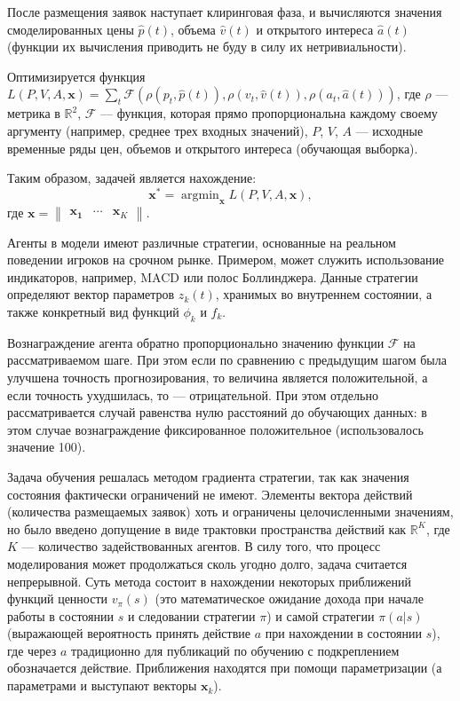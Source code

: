 \documentclass[12pt, a4paper]{extarticle}
\DeclareMathOperator*{\argmin}{argmin}
\renewcommand{\vec}[1]{\mathbf{#1}}
\begin{document}
После размещения заявок наступает клиринговая фаза, и вычисляются значения смоделированных цены $\hat{p}(t)$, 
объема $\hat{v}(t)$ и открытого интереса $\hat{a}(t)$ (функции их вычисления приводить не буду в силу их 
нетривиальности).

Оптимизируется функция $L(P, V, A, \vec{x}) = \sum_t \mathcal{F}(\rho(p_t, \hat{p}(t)), \rho(v_t, \hat{v}(t)),
\rho(a_t, \hat{a}(t)))$, где $\rho$ --- метрика в $\mathbb{R} ^ 2$, $\mathcal{F}$ --- функция, которая прямо
пропорциональна каждому своему аргументу (например, среднее трех входных значений), $P$, $V$, $A$ --- исходные
временные ряды цен, объемов и открытого интереса (обучающая выборка).

Таким образом, задачей является нахождение:
\begin{equation}
    \vec{x}^\ast = \argmin_{\vec{x}} L(P, V, A, \vec{x}),
\end{equation}
где $\vec{x} = \begin{Vmatrix}
    \vec{x_1} & \cdots & \vec{x}_K
\end{Vmatrix}$.

Агенты в модели имеют различные стратегии, основанные на реальном поведении игроков на срочном рынке. Примером,
может служить использование индикаторов, например, MACD или полос Боллинджера\footnotemark. Данные стратегии
определяют вектор параметров $z_k(t)$, хранимых во внутреннем состоянии, а также конкретный вид функций
$\phi_k$ и $f_k$.


Вознаграждение агента обратно пропорционально значению функции $\mathcal{F}$ на рассматриваемом шаге. При
этом если по сравнению с предыдущим шагом была улучшена точность прогнозирования, то величина является
положительной, а если точность ухудшилась, то --- отрицательной. При этом отдельно рассматривается случай
равенства нулю расстояний до обучающих данных: в этом случае вознаграждение фиксированное положительное
(использовалось значение 100).

Задача обучения решалась методом градиента стратегии, так как значения состояния фактически ограничений не
имеют. Элементы вектора действий (количества размещаемых заявок) хоть и ограничены целочисленными значениям,
но было введено допущение в виде трактовки пространства действий как $\mathbb{R}^K$, где $K$ --- количество
задействованных агентов. В силу того, что процесс моделирования может продолжаться сколь угодно долго,
задача считается непрерывной. Суть метода состоит в нахождении некоторых приближений функций ценности 
$v_\pi(s)$ (это математическое ожидание дохода при начале работы в состоянии $s$ и следовании стратегии
$\pi$) и самой стратегии $\pi(a | s)$ (выражающей вероятность принять действие $a$ при нахождении в
состоянии $s$), где через $a$ традиционно для публикаций по обучению с подкреплением обозначается действие.
Приближения находятся при помощи параметризации (а параметрами и выступают векторы $\vec{x}_k$).
\end{document}
